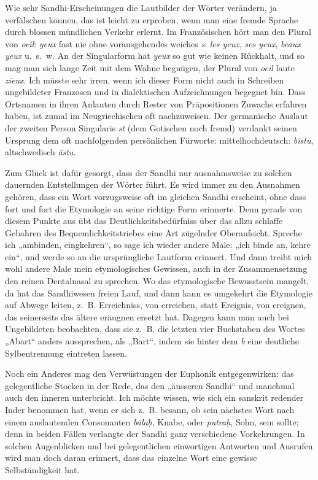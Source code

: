 {Wie sehr Sandhi-Erscheinungen die Lautbilder der Wörter verändern, ja verfälschen können, das ist leicht zu erproben, wenn man eine fremde Sprache durch blossen mündlichen Verkehr erlernt. Im Französischen hört man den Plural von \textit{oeil}: \textit{yeux} fast nie ohne vorausgehendes weiches \textit{s}: \textit{les yeux}, \textit{ses yeux}, \textit{beaux yeux} u.~s.~w. An der Singularform hat \textit{yeux} so gut wie keinen Rückhalt, und so mag man sich lange Zeit mit dem Wahne begnügen, der Plural von \textit{oeil} laute \textit{zieux}. Ich müsste sehr \label{fp.208} irren, wenn ich dieser Form nicht auch in Schreiben ungebildeter Franzosen und in dialektischen Aufzeichnungen begegnet bin. Dass Ortsnamen in ihren Anlauten durch Rester von Präpositionen Zuwachs erfahren haben, ist zumal im Neugriechischen oft nachzuweisen. Der germanische Auslaut der zweiten Person Singularis \textit{st} (dem Gotischen noch fremd) verdankt seinen Ursprung dem oft nachfolgenden persönlichen Fürworte: mittelhochdeutsch: \textit{bistu}, altschwedisch \textit{ästu}.

Zum Glück ist dafür gesorgt, dass der Sandhi nur ausnahmsweise zu solchen dauernden Entstellungen der Wörter führt. Es wird immer zu den Ausnahmen gehören, dass ein Wort vorzugsweise oft im gleichen Sandhi erscheint, ohne dass fort und fort die Etymologie an seine richtige Form erinnerte. Denn gerade von diesem Punkte aus übt das Deutlichkeitsbedürfniss über das allzu schlaffe Gebahren des Bequemlichkeitstriebes eine Art zügelnder Oberaufsicht. Spreche ich „ambinden, eingkehren“, so sage ich wieder andere Male: „ich binde an, kehre ein“, und werde so an die ursprüngliche Lautform erinnert. Und dann treibt mich wohl andere Male mein etymologisches Gewissen, auch in der Zusammensetzung den reinen Dentalnasal zu sprechen. Wo das etymologische Bewusstsein mangelt, da hat das Sandhiwesen freien Lauf, und dann kann es umgekehrt die Etymologie auf Abwege leiten, z.~B. Erreichniss, von erreichen, statt Ereignis, von ereignen, das seinerseits das ältere eräugnen ersetzt hat. Dagegen kann man auch bei Ungebildeten beobachten, dass sie z.~B. die letzten vier Buchstaben des Wortes „Abart“ anders aussprechen, als „Bart“, indem sie hinter dem \textit{b} eine deutliche Sylbentrennung eintreten lassen.

Noch ein Anderes mag den Verwüstungen der Euphonik entgegenwirken: das gelegentliche Stocken in der Rede, das den „äusseren Sandhi“ und manchmal auch den inneren unterbricht. Ich möchte wissen, wie sich ein sanskrit \label{sp.204} redender Inder benommen hat, wenn er sich z.~B. besann, ob sein nächstes Wort nach einem auslautenden  Consonanten \textit{bālaḥ}, Knabe, oder \textit{putraḥ}, Sohn, sein sollte; denn in beiden Fällen verlangte der Sandhi ganz verschiedene Vorkehrungen. In solchen Augenblicken und bei gelegentlichen einwortigen Antworten und Ausrufen wird man doch daran erinnert, dass das einzelne Wort eine gewisse Selbständigkeit hat.

}
